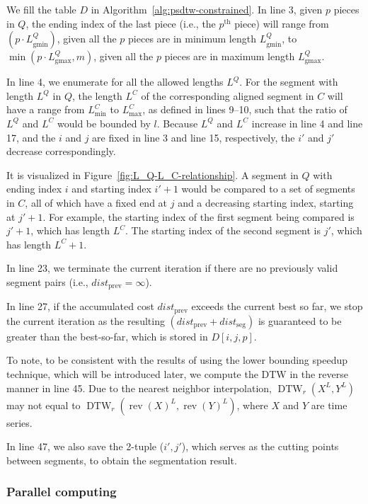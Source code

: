 We fill the table $D$ in Algorithm~\ref{alg:psdtw-constrained}.
In line 3, given $p$ pieces in $Q$, the ending index of the last piece (i.e., the $p^\text{th}$ piece) will range from $(p \cdot L_{\mathrm{gmin}}^Q)$, given all the $p$ pieces are in minimum length $L_{\mathrm{gmin}}^Q$, to $\min(p \cdot L_{\mathrm{gmax}}^Q, m)$, given all the $p$ pieces are in maximum length $L_{\mathrm{gmax}}^Q$.


In line 4, we enumerate for all the allowed lengths $L^Q$.
For the segment with length $L^Q$ in $Q$, the length $L^C$ of the corresponding aligned segment in $C$ will have a range from $L_{\min}^C$ to $L_{\max}^C$, as defined in lines 9--10, such that the ratio of $L^Q$ and $L^C$ would be bounded by $l$.
Because $L^Q$ and $L^C$ increase in line 4 and line 17, 
and the $i$ and $j$ are fixed in line 3 and line 15, respectively, the $i'$ and $j'$ decrease correspondingly.

It is visualized in Figure~\ref{fig:L_Q-L_C-relationship}.
%
A segment in $Q$ with ending index $i$ and starting index $i'+1$ would be compared to a set of segments in $C$, all of which have a fixed end at $j$ and a decreasing starting index, starting at $j'+1$. 
For example, the starting index of the first segment being compared is $j' + 1$, which has length $L^C$.
The starting index of the second segment is $j'$, which has length $L^C + 1$.

In line 23, we terminate the current iteration if there are no previously valid segment pairs (i.e., $\mathit{dist}_\mathrm{prev} = \infty$).

In line 27, if the accumulated cost $\textit{dist}_{\text{prev}}$ exceeds the current best so far, we stop the current iteration as the resulting $(\mathit{dist}_{\mathrm{prev}}+\mathit{dist}_{\mathrm{seg}})$ is guaranteed to be greater than the best-so-far, which is stored in $D[i, j, p]$.

To note, to be consistent with the results of using the lower bounding speedup technique, which will be introduced later, we compute the DTW in the reverse manner in line 45.
Due to the nearest neighbor interpolation, $\operatorname{DTW}_r(X^L, Y^L)$ may not equal to $\operatorname{DTW}_r(\operatorname{rev}(X)^L, \operatorname{rev}(Y)^L)$, where $X$ and $Y$ are time series.

In line 47, we also save the 2-tuple ($i', j'$), which serves as the cutting points between segments, to obtain the segmentation result.

\subsubsection{Parallel computing} %

